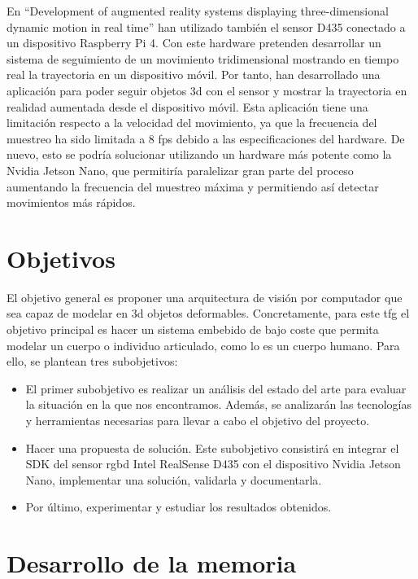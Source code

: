 En ``Development of augmented reality systems displaying three-dimensional
dynamic motion in real time'' \citep{Aoki2020} han utilizado también el sensor D435 conectado a un dispositivo Raspberry Pi 4.
Con este hardware pretenden desarrollar un sistema de seguimiento de un movimiento tridimensional mostrando en tiempo real la trayectoria en un dispositivo móvil.
Por tanto, han desarrollado una aplicación para poder seguir objetos \gls{3d} con el sensor y mostrar la trayectoria en realidad aumentada desde el dispositivo móvil.
Esta aplicación tiene una limitación respecto a la velocidad del movimiento, ya que la frecuencia del muestreo ha sido limitada a 8 fps debido a las especificaciones del hardware.
De nuevo, esto se podría solucionar utilizando un hardware más potente como la Nvidia Jetson Nano, que permitiría paralelizar gran parte del proceso aumentando la frecuencia del muestreo máxima y permitiendo así detectar movimientos más rápidos.

\section{Objetivos}
\label{introduccion-objetivos}

El objetivo general es proponer una arquitectura de visión por computador que sea capaz de modelar en \gls{3d} objetos deformables. Concretamente, para este \gls{tfg} el objetivo principal es hacer un sistema embebido de bajo coste que permita modelar un cuerpo o individuo articulado, como lo es un cuerpo humano.
Para ello, se plantean tres subobjetivos:

\begin{itemize}
    \item El primer subobjetivo es realizar un análisis del estado del arte para evaluar la situación en la que nos encontramos. Además, se analizarán las tecnologías y herramientas necesarias para llevar a cabo el objetivo del proyecto.
    \item Hacer una propuesta de solución. Este subobjetivo consistirá en integrar el SDK del sensor \gls{rgbd} Intel RealSense D435 con el dispositivo Nvidia Jetson Nano, implementar una solución, validarla y documentarla.
    \item Por último, experimentar y estudiar los resultados obtenidos.
\end{itemize}

\section{Desarrollo de la memoria}
\label{introduccion-desarrollo}

